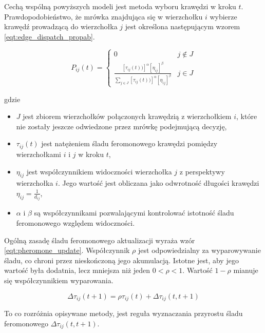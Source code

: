 {    Cechą wspólną powyższych modeli jest metoda wyboru krawędzi w kroku $t$. Prawdopodobieństwo, że mrówka znajdująca
    się w wierzchołku $i$ wybierze krawędź prowadzącą do wierzchołka $j$ jest określona następującym wzorem
    \ref{eqt:edge_dispatch_propab}.

    \begin{equation}\label{eqt:edge_dispatch_propab}
        P_{ij}(t) = \left\{\begin{matrix}
            0 & j \not\in J\\
            \frac{[\tau_{ij}(t))]^\alpha [\eta_{ij}]^\beta}{\sum_{j\in J} {[\tau_{ij}(t))]^\alpha [\eta_{ij}]^\beta} } & j \in J
            \end{matrix}\right.
    \end{equation}

    gdzie
    \begin{itemize}
        \item $J$ jest zbiorem wierzchołków połączonych krawędzią z wierzchołkiem $i$, które nie zostały jeszcze
        odwiedzone przez mrówkę podejmującą decyzję,
        \item $\tau_{ij}(t)$ jest natężeniem śladu feromonowego krawędzi pomiędzy wierzchołkami $i$ i $j$ w kroku $t$,
        \item $\eta_{ij}$ jest współczynnikiem widoczności wierzchołka $j$ z perspektywy wierzchołka $i$. Jego wartość
        jest obliczana jako odwrotność długości krawędzi $\eta_{ij} = \frac{1}{d_{ij}}$,
        \item $\alpha$ i $\beta$ są współczynnikami pozwalającymi kontrolować istotność śladu feromonowego względem
        widoczności.
    \end{itemize}

    Ogólną zasadę śladu feromonowego aktualizacji wyraża wzór \ref{eqt:pheromone_update}. Współczynnik $\rho$ jest
    odpowiedzialny za wyparowywanie śladu, co chroni przez nieskończoną jego akumulacją. Istotne jest, aby jego wartość
    była dodatnia, lecz mniejsza niż jeden $0 < \rho < 1$. Wartość $1 - \rho$ mianuje się współczynnikiem wyparowania.

    \begin{equation}\label{eqt:pheromone_update}
        \Delta\tau_{ij}(t + 1) = \rho\tau_{ij}(t) + \Delta\tau_{ij}(t, t + 1)
    \end{equation}

    To co rozróżnia opisywane metody, jest reguła wyznaczania przyrostu śladu feromonowego $\Delta\tau_{ij}(t, t + 1)$.

}
